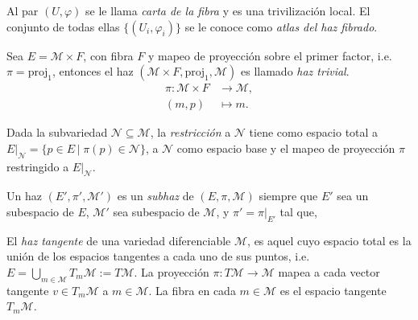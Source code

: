 \begin{mydef}
Al par $(U, \varphi)$ se le llama \emph{carta de la fibra} y es una trivilizaci\'{o}n local. El conjunto de todas ellas $\{(U_{i}, \varphi_{i})\}$ se le conoce como \emph{atlas del haz fibrado}.
\end{mydef}

\begin{mydef}
Sea $E=\mathcal{M} \times F$, con fibra $F$ y mapeo de proyecci\'{o}n sobre el primer factor, i.e. $\pi = \mathrm{proj}_{1}$, entonces el haz $(\mathcal{M} \times F, \mathrm{proj}_{1}, \mathcal{M})$ es llamado \emph{haz trivial}.
%
\begin{align*}
\pi: \mathcal{M} \times F & \longrightarrow \mathcal{M}, \\
(m, p) & \longmapsto m.
\end{align*}
%
\end{mydef}

\begin{mydef}[Restricci\'{o}n]
Dada la subvariedad $\mathcal{N} \subseteq \mathcal{M}$, la \emph{restricci\'{o}n} a $\mathcal{N}$ tiene como espacio total a $E\vert_{\mathcal{N}} = \{p \in E \, \vert \; \pi(p) \in \mathcal{N}\}$, a $\mathcal{N}$ como espacio base y el mapeo de proyecci\'{o}n $\pi$ restringido a $E\vert_{\mathcal{N}}$.
\end{mydef}

\begin{mydef}
Un haz $(E', \pi', \mathcal{M}')$ es un \emph{subhaz} de $(E, \pi, \mathcal{M})$ siempre que $E'$ sea un subespacio de $E$, $\mathcal{M}'$ sea subespacio de $\mathcal{M}$, y $\pi' = \pi\vert_{E'}$ tal que,
%
\begin{center}
\end{center}
%
\end{mydef}

\begin{ex}
El \emph{haz tangente} de una variedad diferenciable $\mathcal{M}$, es aquel cuyo espacio total es la uni\'{o}n de los espacios tangentes a cada uno de sus puntos, i.e. $E =  \bigcup\limits_{m \in \mathcal{M}} T_{m} \mathcal{M} := T \mathcal{M}$. La proyecci\'{o}n $\pi: T \mathcal{M} \longrightarrow \mathcal{M}$ mapea a cada vector tangente $v \in T_{m} \mathcal{M}$ a $m \in \mathcal{M}$. La fibra en cada $m \in \mathcal{M}$ es el espacio tangente $T_{m} \mathcal{M}$.
\end{ex}

